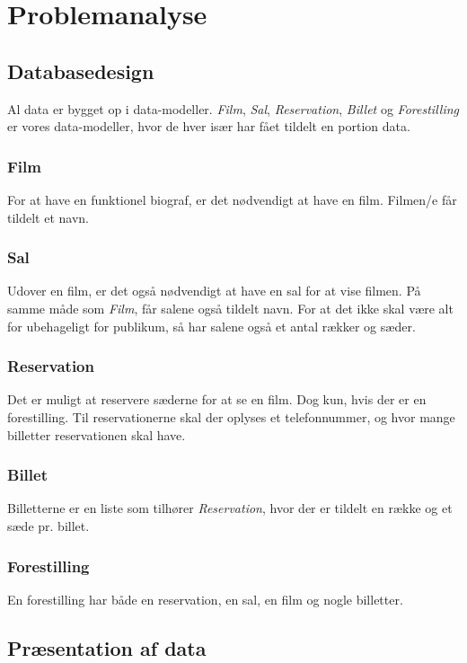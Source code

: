 \chapter{Problemanalyse}

\section{Databasedesign}
Al data er bygget op i data-modeller. \textit{Film}, \textit{Sal}, \textit{Reservation}, \textit{Billet} og \textit{Forestilling} er vores data-modeller, hvor de hver især har fået tildelt en portion data.

\subsection{Film}
For at have en funktionel biograf, er det nødvendigt at have en film. 
Filmen/e får tildelt et navn.

\subsection{Sal}
Udover en film, er det også nødvendigt at have en sal for at vise filmen. På samme måde som \textit{Film}, får salene også tildelt navn. For at det ikke skal være alt for ubehageligt for publikum, så har salene også et antal rækker og sæder. 

\subsection{Reservation}
Det er muligt at reservere sæderne for at se en film. Dog kun, hvis der er en forestilling. Til reservationerne skal der oplyses et telefonnummer, og hvor mange billetter reservationen skal have.

\subsection{Billet}
Billetterne er en liste som tilhører \textit{Reservation}, hvor der er tildelt en række og et sæde pr. billet. 

\subsection{Forestilling}
En forestilling har både en reservation, en sal, en film og nogle billetter.

\section{Præsentation af data}

